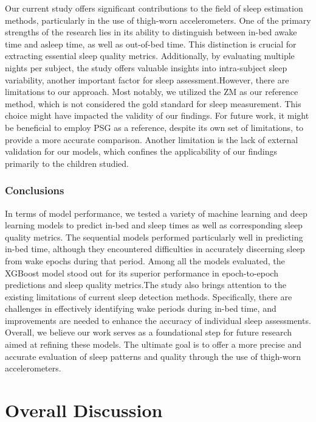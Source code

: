 \documentclass[
  9pt,
]{scrbook}
\begin{document}
Our current study offers significant contributions to the field of sleep
estimation methods, particularly in the use of thigh-worn
accelerometers. One of the primary strengths of the research lies in its
ability to distinguish between in-bed awake time and asleep time, as
well as out-of-bed time. This distinction is crucial for extracting
essential sleep quality metrics. Additionally, by evaluating multiple
nights per subject, the study offers valuable insights into
intra-subject sleep variability, another important factor for sleep
assessment.However, there are limitations to our approach. Most notably,
we utilized the ZM as our reference method, which is not considered the
gold standard for sleep measurement. This choice might have impacted the
validity of our findings. For future work, it might be beneficial to
employ PSG as a reference, despite its own set of limitations, to
provide a more accurate comparison. Another limitation is the lack of
external validation for our models, which confines the applicability of
our findings primarily to the children studied.

\hypertarget{conclusions-2}{%
\subsection{Conclusions}\label{conclusions-2}}

In terms of model performance, we tested a variety of machine learning
and deep learning models to predict in-bed and sleep times as well as
corresponding sleep quality metrics. The sequential models performed
particularly well in predicting in-bed time, although they encountered
difficulties in accurately discerning sleep from wake epochs during that
period. Among all the models evaluated, the XGBoost model stood out for
its superior performance in epoch-to-epoch predictions and sleep quality
metrics.The study also brings attention to the existing limitations of
current sleep detection methods. Specifically, there are challenges in
effectively identifying wake periods during in-bed time, and
improvements are needed to enhance the accuracy of individual sleep
assessments. Overall, we believe our work serves as a foundational step
for future research aimed at refining these models. The ultimate goal is
to offer a more precise and accurate evaluation of sleep patterns and
quality through the use of thigh-worn accelerometers.

\hypertarget{overall-discussion}{%
\chapter{Overall Discussion}\label{overall-discussion}}
\end{document}
